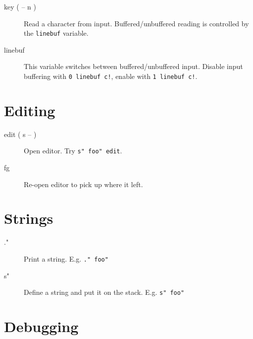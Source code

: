 \begin{description}
\item[key ( -- n )]

Read a character from input. Buffered/unbuffered reading is controlled by the \texttt{linebuf} variable.

\item[linebuf]

This variable switches between buffered/unbuffered input. Disable input buffering with \texttt{0 linebuf c!}, enable with \texttt{1 linebuf c!}.

\end{description}

\section{Editing}

\begin{description}
\item[edit ( s -- )]

Open editor. Try \texttt{s" foo" edit}.

\item[fg]

Re-open editor to pick up where it left.

\end{description}

\section{Strings}

\begin{description}
\item[."]

Print a string. E.g. \texttt{." foo"}

\item[s"]

Define a string and put it on the stack. E.g. \texttt{s" foo"}

\end{description}

\section{Debugging}

